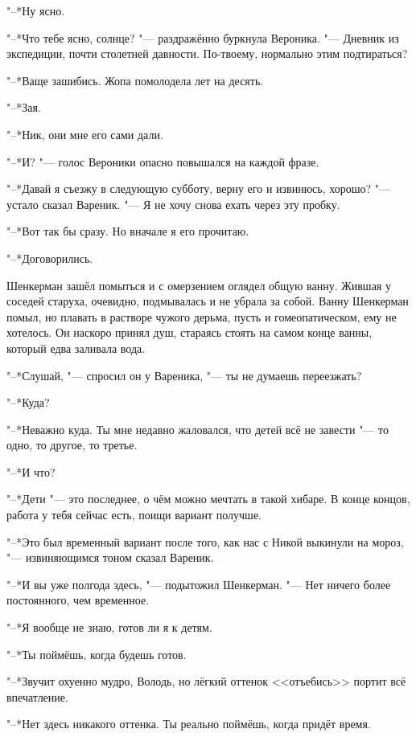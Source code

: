 "--*Ну ясно.

"--*Что тебе ясно, солнце? "--- раздражённо буркнула Вероника.
"--- Дневник из экспедиции, почти столетней давности.
По-твоему, нормально этим подтираться?

"--*Ваще зашибись.
Жопа помолодела лет на десять.

"--*Зая.

"--*Ник, они мне его сами дали.

"--*И? "--- голос Вероники опасно повышался на каждой фразе.

"--*Давай я съезжу в следующую субботу, верну его и извинюсь, хорошо? "--- устало сказал Вареник.
"--- Я не хочу снова ехать через эту пробку.

"--*Вот так бы сразу.
Но вначале я его прочитаю.

"--*Договорились.

\asterism

\textspace

Шенкерман зашёл помыться и с омерзением оглядел общую ванну.
Жившая у соседей старуха, очевидно, подмывалась и не убрала за собой.
Ванну Шенкерман помыл, но плавать в растворе чужого дерьма, пусть и гомеопатическом, ему не хотелось.
Он наскоро принял душ, стараясь стоять на самом конце ванны, который едва заливала вода.

"--*Слушай, "--- спросил он у Вареника, "--- ты не думаешь переезжать?

"--*Куда?

"--*Неважно куда.
Ты мне недавно жаловался, что детей всё не завести "--- то одно, то другое, то третье.

"--*И что?

"--*Дети "--- это последнее, о чём можно мечтать в такой хибаре.
В конце концов, работа у тебя сейчас есть, поищи вариант получше.

"--*Это был временный вариант после того, как нас с Никой выкинули на мороз, "--- извиняющимся тоном сказал Вареник.

"--*И вы уже полгода здесь, "--- подытожил Шенкерман.
"--- Нет ничего более постоянного, чем временное.

"--*Я вообще не знаю, готов ли я к детям.

"--*Ты поймёшь, когда будешь готов.

"--*Звучит охуенно мудро, Володь, но лёгкий оттенок <<отъебись>> портит всё впечатление.

"--*Нет здесь никакого оттенка.
Ты реально поймёшь, когда придёт время.

